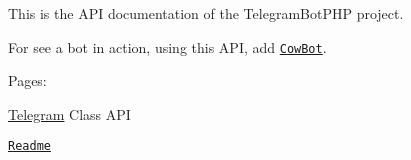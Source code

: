 This is the A\-P\-I documentation of the Telegram\-Bot\-P\-H\-P project.\par
 For see a bot in action, using this A\-P\-I, add \href{https://telegram.me/cowmooobot}{\tt Cow\-Bot}.\par
 Pages\-:\par
 \hyperlink{class_telegram}{Telegram} Class A\-P\-I \par
 \href{md__r_e_a_d_m_e.html}{\tt Readme} 